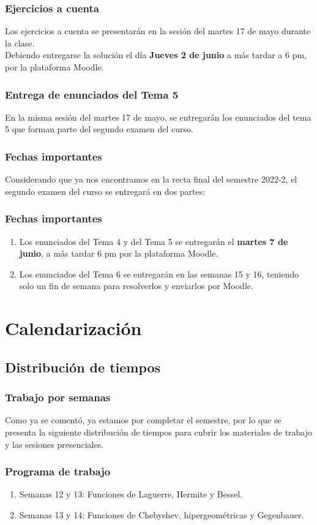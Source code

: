 \documentclass[12pt]{beamer}
\begin{document}
\begin{frame}
\frametitle{Ejercicios a cuenta}
Los ejercicios a cuenta se presentarán en la sesión del martes 17 de mayo durante la clase.
\\
\bigskip
\pause
Debiendo entregarse la solución el día \textbf{Jueves 2 de junio} a más tardar a 6 pm, por la plataforma Moodle.
\end{frame}
\begin{frame}
\frametitle{Entrega de enunciados del Tema 5}
En la misma sesión del martes 17 de mayo, se entregarán los enunciados del tema 5 que forman parte del segundo examen del curso.
\end{frame}
\begin{frame}
\frametitle{Fechas importantes}
Considerando que ya nos encontramos en la recta final del semestre 2022-2, el segundo examen del curso se entregará en dos partes:
\end{frame}
\begin{frame}
\frametitle{Fechas importantes}    
\begin{enumerate}[<+->]
\item Los enunciados del Tema 4 y del Tema 5 se entregarán el \textbf{martes 7 de junio}, a más tardar 6 pm por la plataforma Moodle.
\item Los enunciados del Tema 6 se entregarán en las semanas 15 y 16, \pause teniendo solo un fin de semana para resolverlos y enviarlos por Moodle.
\end{enumerate}
\end{frame}

\section{Calendarización}
\subsection{Distribución de tiempos}

\begin{frame}
\frametitle{Trabajo por semanas}
Como ya se comentó, ya estamos por completar el semestre, por lo que se presenta la siguiente distribución de tiempos para cubrir los materiales de trabajo y las sesiones presenciales.
\end{frame}
\begin{frame}
\frametitle{Programa de trabajo}
\begin{enumerate}[<+->]
\item Semanas 12 y 13: Funciones de Laguerre, Hermite y Bessel.
\item Semanas 13 y 14: Funciones de Chebyshev, hipergeométricas y Gegenbauer.
\end{enumerate}
\end{frame}
\end{document}
